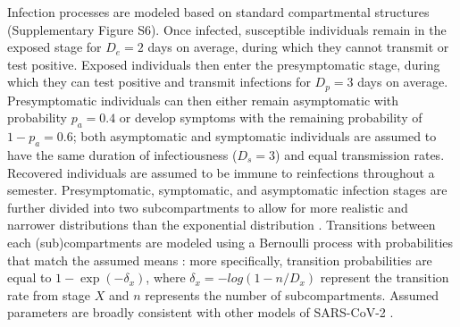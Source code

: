 \documentclass[12pt]{article}
\begin{document}
Infection processes are modeled based on standard compartmental structures (Supplementary Figure S6).
Once infected, susceptible individuals remain in the exposed stage for $D_e = 2$ days on average, during which they cannot transmit or test positive. 
Exposed individuals then enter the presymptomatic stage, during which they can test positive and transmit infections for $D_p = 3$ days on average.
Presymptomatic individuals can then either remain asymptomatic with probability $p_a = 0.4$ or develop symptoms with the remaining probability of $1-p_a = 0.6$; both asymptomatic and symptomatic individuals are assumed to have the same duration of infectiousness ($D_s=3$) and equal transmission rates.
Recovered individuals are assumed to be immune to reinfections throughout a semester.
Presymptomatic, symptomatic, and asymptomatic infection stages are further divided into two subcompartments to allow for more realistic and narrower distributions than the exponential distribution \citep{brett2020transmission}.
Transitions between each (sub)compartments are modeled using a Bernoulli process with probabilities that match the assumed means \citep{he2010plug}:
more specifically, transition probabilities are equal to $1 - \exp(-\delta_x)$, where $\delta_x = -log(1-n/D_x)$ represent the transition rate from stage $X$ and $n$ represents the number of subcompartments.
Assumed parameters are broadly consistent with other models of SARS-CoV-2 \citep{brett2020transmission,lavezzo2020suppression}.
\end{document}
